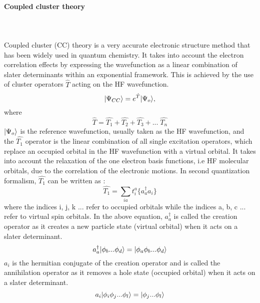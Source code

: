 \paragraph{Coupled cluster theory} ~ \\\\
Coupled cluster\cite{Crawford00} (CC) theory is a very accurate electronic
structure method that has been widely used in quantum chemistry.
It takes into account the electron correlation effects by expressing the
wavefunction as a linear combination of slater determinants within an
exponential framework. This is achieved by the use of cluster operators $\hat{T}$ 
acting on the HF wavefunction.
\begin{equation}
| \Psi_{CC} \rangle = e^{\hat{T}}| \Psi_{o} \rangle , 
\end{equation}
where
\begin{equation}
 \hat{T} = \hat{T_1} + \hat{T_2} + \hat{T_3} + ... \;\hat {T_n} 
\end{equation}
$| \Psi_{o} \rangle$ is the reference wavefunction, usually taken as the HF
wavefunction, and the $\hat{T_1}$ operator is the linear combination of all single excitation
operators, which replace an occupied orbital in the HF wavefunction with a
virtual orbital. It takes into account the relaxation of the one electron basis
functions, i.e HF molecular orbitals, due to the correlation of the electronic
motions. In second quantization\cite{JorgensenSimons81} formalism, $\hat{T_1}$
can be written as :
\begin{equation}
\hat{T_1} = \sum_{ia}t^a_i\{{a}^\dagger_a a_i\}
\end{equation}
where the indices i, j, k ... refer to occupied orbitals while
the indices a, b, c ... refer to virtual spin orbitals.
In the above equation, ${a}^\dagger_a$ is called the creation operator as it
creates a new particle state (virtual orbital) when it acts on a slater determinant.
\begin{equation}
{a}^\dagger_a| \phi_b...\phi_d \rangle = | \phi_a\phi_b...\phi_d \rangle
\end{equation}
$a_i$ is the hermitian conjugate of the creation operator and is called
the annihilation operator as it removes a hole state (occupied orbital) when it acts on a
slater determinant.
\begin{equation}
a_i| \phi_i\phi_j...\phi_l \rangle = | \phi_j...\phi_l \rangle
\end{equation}
